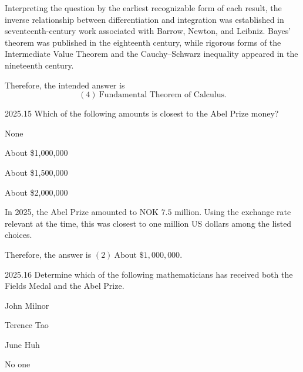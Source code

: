     \begin{solution}
        Interpreting the question by the earliest recognizable form of each
        result, the inverse relationship between differentiation and integration
        was established in seventeenth-century work associated with Barrow,
        Newton, and Leibniz. Bayes' theorem was published in the eighteenth
        century, while rigorous forms of the Intermediate Value Theorem and the
        Cauchy--Schwarz inequality appeared in the nineteenth century.

        Therefore, the intended answer is
        \[
            \boxed{(4)\ \text{Fundamental Theorem of Calculus}}.
        \]
    \end{solution}

    \begin{pastproblem}{2025.15}
        Which of the following amounts is closest to the Abel Prize money?
        \begin{problemchoices}
            \item None
            \item About \$1{,}000{,}000
            \item About \$1{,}500{,}000
            \item About \$2{,}000{,}000
        \end{problemchoices}
    \end{pastproblem}

    \begin{solution}
        In 2025, the Abel Prize amounted to NOK $7.5$ million. Using the exchange rate relevant at
        the time, this was closest to one million US dollars among the listed choices.

        Therefore, the answer is $\boxed{(2)\ \text{About }\$1{,}000{,}000}$.
    \end{solution}

    \begin{pastproblem}{2025.16}
        Determine which of the following mathematicians has received both the Fields Medal and the
        Abel Prize.
        \begin{problemchoices}
            \item John Milnor
            \item Terence Tao
            \item June Huh
            \item No one
        \end{problemchoices}
    \end{pastproblem}

